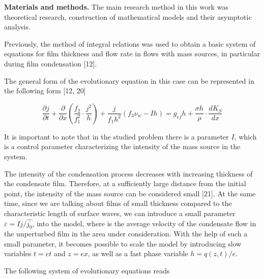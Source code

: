 \begin{multicols}{2}
{\bfseries Materials and methods.} The main research method in this work
was theoretical research, construction of mathematical models and their
asymptotic analysis.

Previously, the method of integral relations was used to obtain a basic
system of equations for film thickness and flow rate in flows with mass
sources, in particular during film condensation {[}12{]}.

The general form of the evolutionary equation in this case can be
represented in the following form {[}12, 20{]}
\end{multicols}
\begin{equation}
\frac{\partial j}{\partial t}
+ \frac{\partial}{\partial x} \left(
    \frac{f_2}{f_1^2} \cdot \frac{j^2}{h}
\right)
+ \frac{j}{f_1 h^2} \left(
    f_3 \nu_w - \mathit{Ih}
\right)
= g_{\mathit{ef}} h + \frac{\sigma h}{\rho} \cdot \frac{\mathit{dK}_S}{\mathit{dx}}
\end{equation}

\begin{multicols}{2}
It is important to note that in the studied problem there is a parameter $I$,
which is a control parameter characterizing the intensity of the mass
source in the system.

The intensity of the condensation process decreases with increasing
thickness of the condensate film. Therefore, at a sufficiently large
distance from the initial point, the intensity of the mass source can be
considered small {[}21{]}. At the same time, since we are talking about
films of small thickness compared to the characteristic length of
surface waves, we can introduce a small parameter
$\varepsilon=Ij/\hat{j_0}$,
into the model, where is the average velocity of the condensate flow
in the unperturbed film in the area under consideration. With the help
of such a small parameter, it becomes possible to scale the model by
introducing slow variables $t=et$ and $z=ex$, as well as a fast phase
variable $h=q(z,t)/e$.

The following system of evolutionary equations reads
\end{multicols}

